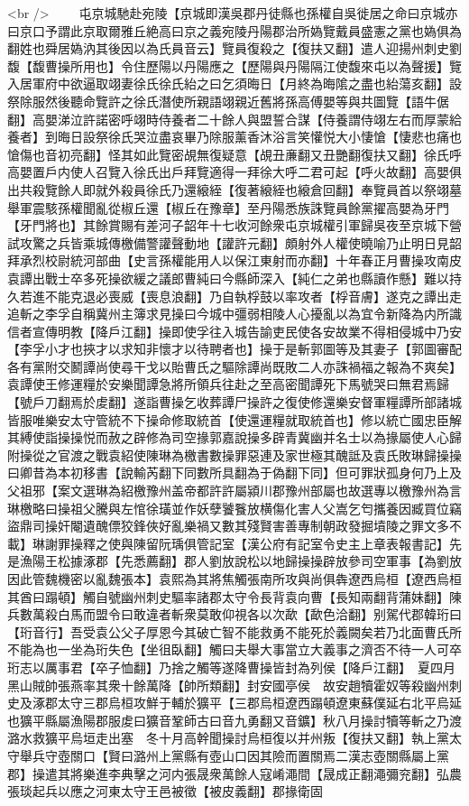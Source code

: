 <br />
　　屯京城馳赴宛陵【京城即漢吳郡丹徒縣也孫權自吳徙居之命曰京城亦曰京口予謂此京取爾雅丘絶高曰京之義宛陵丹陽郡治所媯覽戴員盛憲之黨也媯俱為翻姓也舜居媯汭其後因以為氏員音云】覽員復殺之【復扶又翻】遣人迎揚州刺史劉馥【馥曹操所用也】令住歷陽以丹陽應之【歷陽與丹陽隔江使馥來屯以為聲援】覽入居軍府中欲逼取翊妻徐氏徐氏紿之曰乞須晦日【月終為晦隂之盡也紿蕩亥翻】設祭除服然後聽命覽許之徐氏潛使所親語翊親近舊將孫高傅嬰等與共圖覽【語牛倨翻】高嬰涕泣許諾密呼翊時侍養者二十餘人與盟誓合謀【侍養謂侍翊左右而厚蒙給養者】到晦日設祭徐氏哭泣盡哀畢乃除服薰香沐浴言笑懽悦大小悽愴【悽悲也痛也愴傷也音初亮翻】怪其如此覽密覘無復疑意【覘丑亷翻又丑艷翻復扶又翻】徐氏呼高嬰置戶内使人召覽入徐氏出戶拜覽適得一拜徐大呼二君可起【呼火故翻】高嬰俱出共殺覽餘人即就外殺員徐氏乃還縗絰【復著縗絰也縗倉回翻】奉覽員首以祭翊墓舉軍震駭孫權聞亂從椒丘還【椒丘在豫章】至丹陽悉族誅覽員餘黨擢高嬰為牙門【牙門將也】其餘賞賜有差河子韶年十七收河餘衆屯京城權引軍歸吳夜至京城下營試攻驚之兵皆乘城傳檄備警讙聲動地【讙許元翻】頗射外人權使曉喻乃止明日見韶拜承烈校尉統河部曲【史言孫權能用人以保江東射而亦翻】十年春正月曹操攻南皮袁譚出戰士卒多死操欲緩之議郎曹純曰今縣師深入【純仁之弟也縣讀作懸】難以持久若進不能克退必喪威【喪息浪翻】乃自執桴鼓以率攻者【桴音膚】遂克之譚出走追斬之李孚自稱冀州主簿求見操曰今城中彊弱相陵人心擾亂以為宜令新降為内所識信者宣傳明教【降戶江翻】操即使孚往入城告諭吏民使各安故業不得相侵城中乃安【李孚小才也挾才以求知非懷才以待聘者也】操于是斬郭圖等及其妻子【郭圖審配各有黨附交鬭譚尚使尋干戈以貽曹氏之驅除譚尚既敗二人亦誅禍福之報為不爽矣】袁譚使王修運糧於安樂聞譚急將所領兵往赴之至高密聞譚死下馬號哭曰無君焉歸【號戶刀翻焉於䖍翻】遂詣曹操乞收葬譚尸操許之復使修還樂安督軍糧譚所部諸城皆服唯樂安太守管統不下操命修取統首【使還運糧就取統首也】修以統亡國忠臣解其縛使詣操操悦而赦之辟修為司空掾郭嘉說操多辟青冀幽并名士以為掾屬使人心歸附操從之官渡之戰袁紹使陳琳為檄書數操罪惡連及家世極其醜詆及袁氏敗琳歸操操曰卿昔為本初移書【說輸芮翻下同數所具翻為于偽翻下同】但可罪狀孤身何乃上及父祖邪【案文選琳為紹檄豫州盖帝都許許屬潁川郡豫州部屬也故選專以檄豫州為言琳檄略曰操祖父騰與左悺徐璜並作妖孽饕餮放横傷化害人父嵩乞匄攜養因臧買位竊盜鼎司操奸閹遺醜僄狡鋒俠好亂樂禍又數其殘賢害善專制朝政發掘墳陵之罪文多不載】琳謝罪操釋之使與陳留阮瑀俱管記室【漢公府有記室令史主上章表報書記】先是漁陽王松據涿郡【先悉薦翻】郡人劉放說松以地歸操操辟放參司空軍事【為劉放因此管魏機密以亂魏張本】袁熙為其將焦觸張南所攻與尚俱犇遼西烏桓【遼西烏桓其酋曰蹋頓】觸自號幽州刺史驅率諸郡太守令長背袁向曹【長知兩翻背蒲妹翻】陳兵數萬殺白馬而盟令曰敢違者斬衆莫敢仰視各以次歃【歃色洽翻】别駕代郡韓珩曰【珩音行】吾受袁公父子厚恩今其破亡智不能救勇不能死於義闕矣若乃北面曹氏所不能為也一坐為珩失色【坐徂臥翻】觸曰夫舉大事當立大義事之濟否不待一人可卒珩志以厲事君【卒子恤翻】乃捨之觸等遂降曹操皆封為列侯【降戶江翻】　夏四月黑山賊帥張燕率其衆十餘萬降【帥所類翻】封安國亭侯　故安趙犢霍奴等殺幽州刺史及涿郡太守三郡烏桓攻鮮于輔於獷平【三郡烏桓遼西蹋頓遼東蘇僕延右北平烏延也獷平縣屬漁陽郡服䖍曰獷音鞏師古曰音九勇翻又音鑛】秋八月操討犢等斬之乃渡潞水救獷平烏垣走出塞　冬十月高幹聞操討烏桓復以并州叛【復扶又翻】執上黨太守舉兵守壺關口【賢曰潞州上黨縣有壺山口因其險而置關焉二漢志壺關縣屬上黨郡】操遣其將樂進李典擊之河内張晟衆萬餘人寇崤澠間【晟成正翻澠彌兖翻】弘農張琰起兵以應之河東太守王邑被徵【被皮義翻】郡掾衛固